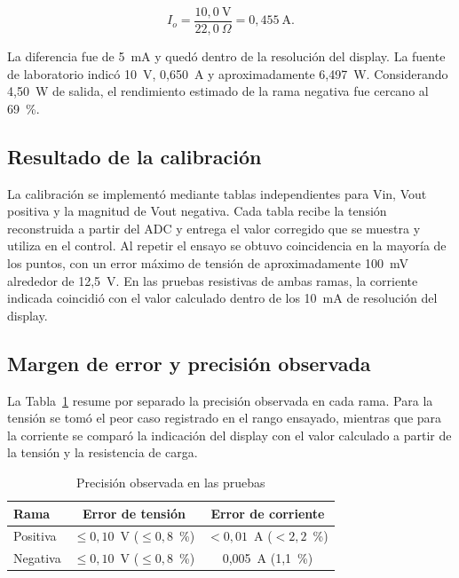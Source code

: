 \documentclass[conference]{IEEEtran}
\begin{document}
\begin{equation}
I_o=\frac{10,0\ \mathrm{V}}{22,0\ \Omega}=0,455\ \mathrm{A}.
\end{equation}

La diferencia fue de 5~mA y quedó dentro de la resolución del display. La fuente de laboratorio indicó 10~V, 0,650~A y aproximadamente 6,497~W. Considerando 4,50~W de salida, el rendimiento estimado de la rama negativa fue cercano al 69~\%.

\subsection{Resultado de la calibración}

La calibración se implementó mediante tablas independientes para Vin, Vout positiva y la magnitud de Vout negativa. Cada tabla recibe la tensión reconstruida a partir del ADC y entrega el valor corregido que se muestra y utiliza en el control. Al repetir el ensayo se obtuvo coincidencia en la mayoría de los puntos, con un error máximo de tensión de aproximadamente 100~mV alrededor de 12,5~V. En las pruebas resistivas de ambas ramas, la corriente indicada coincidió con el valor calculado dentro de los 10~mA de resolución del display.

\subsection{Margen de error y precisión observada}

La Tabla~\ref{tab:precision} resume por separado la precisión observada en cada rama. Para la tensión se tomó el peor caso registrado en el rango ensayado, mientras que para la corriente se comparó la indicación del display con el valor calculado a partir de la tensión y la resistencia de carga.

\begin{table}[!t]
\caption{Precisión observada en las pruebas}
\label{tab:precision}
\centering
\footnotesize
\begin{tabular}{@{}lcc@{}}
\toprule
\textbf{Rama} & \textbf{Error de tensión} & \textbf{Error de corriente} \\
\midrule
Positiva & $\leq 0,10$~V ($\leq 0,8$~\%) & $<0,01$~A ($<2,2$~\%) \\
Negativa & $\leq 0,10$~V ($\leq 0,8$~\%) & 0,005~A (1,1~\%) \\
\bottomrule
\end{tabular}
\end{table}
\end{document}
